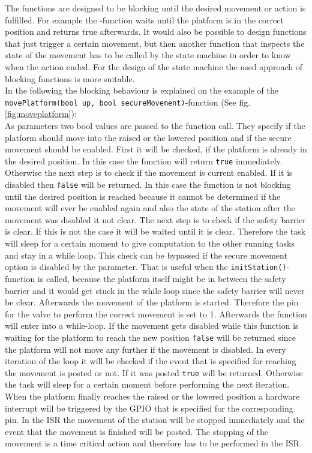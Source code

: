 The functions are designed to be blocking until the desired movement or action is fulfilled. For example the -function waits until the platform is in the correct position and returns true afterwards. It would also be possible to design functions that just trigger a certain movement, but then another function that inspects the state of the movement has to be called by the state machine in order to know when the action ended. For the design of the state machine the used approach of blocking functions is more suitable. \\

In the following the blocking behaviour is explained on the example of the \texttt{movePlatform(bool up, bool secureMovement)}-function (See fig. \ref{fig:moveplatform}): \\
As parameters two bool values are passed to the function call. They specify if the platform should move into the raised or the lowered position and if the secure movement should be enabled. 
First it will be checked, if the platform is already in the desired position. In this case the function will return \texttt{true} immediately. Otherwise the next step is to check if the movement is current enabled. If it is disabled then \texttt{false} will be returned. In this case the function is not blocking until the desired position is reached because it cannot be determined if the movement will ever be enabled again and also the state of the station after the movement was disabled it not clear.
The next step is to check if the safety barrier is clear. If this is not the case it will be waited until it is clear. Therefore the task will sleep for a certain moment to give computation to the other running tasks and stay in a while loop. This check can be bypassed if the secure movement option is disabled by the parameter. That is useful when the \texttt{initStation()}-function is called, because the platform itself might be in between the safety barrier and it would get stuck in the while loop since the safety barrier will never be clear.
Afterwards the movement of the platform is started. Therefore the pin for the valve to perform the correct movement is set to 1. 
Afterwards the function will enter into a while-loop. If the movement gets disabled while this function is waiting for the platform to reach the new position \texttt{false} will be returned since the platform will not move any further if the movement is disabled. In every iteration of the loop it will be checked if the event that is specified for reaching the movement is posted or not. If it was posted \texttt{true} will be returned. Otherwise the task will sleep for a certain moment before performing the next iteration.\\
When the platform finally reaches the raised or the lowered position a hardware interrupt will be triggered by the GPIO that is specified for the corresponding pin.%
 In the ISR the movement of the station will be stopped immediately and the event that the movement is finished will be posted. The stopping of the movement is a time critical action and therefore has to be performed in the ISR. 


